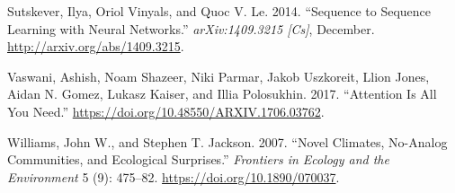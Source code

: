 \documentclass{article}
\newlength{\cslhangindent}
\newlength{\cslentryspacingunit} %
\newenvironment{CSLReferences}[2] %
 {%
  \setlength{\parindent}{0pt}
  \ifodd #1
  \let\oldpar\par
  \def\par{\hangindent=\cslhangindent\oldpar}
  \fi
  \setlength{\parskip}{#2\cslentryspacingunit}
 }%
 {}
\begin{document}
\begin{CSLReferences}{1}{0}
\leavevmode{}%
Sutskever, Ilya, Oriol Vinyals, and Quoc V. Le. 2014. {``Sequence to
{Sequence} {Learning} with {Neural} {Networks}.''} \emph{arXiv:1409.3215
{[}Cs{]}}, December. \url{http://arxiv.org/abs/1409.3215}.

\leavevmode{}%
Vaswani, Ashish, Noam Shazeer, Niki Parmar, Jakob Uszkoreit, Llion
Jones, Aidan N. Gomez, Lukasz Kaiser, and Illia Polosukhin. 2017.
{``Attention {Is} {All} {You} {Need}.''}
\url{https://doi.org/10.48550/ARXIV.1706.03762}.

\leavevmode{}%
Williams, John W., and Stephen T. Jackson. 2007. {``Novel Climates,
No-Analog Communities, and Ecological Surprises.''} \emph{Frontiers in
Ecology and the Environment} 5 (9): 475--82.
\url{https://doi.org/10.1890/070037}.

\end{CSLReferences}



\end{document}
